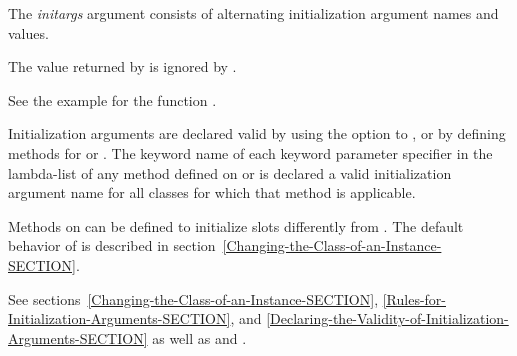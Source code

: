 \begin{defun}
The \emph{initargs} argument consists of alternating initialization
argument names and values.

The value returned by  is
ignored by .

See the example for the function .

Initialization arguments are declared valid by using the 
 option to , or by defining methods for 
 or .  The
keyword name of each keyword parameter specifier in the lambda-list of
any method defined on  or 
 is declared a valid initialization argument name
for all classes for which that method is applicable.

Methods on  can be defined to
initialize slots differently from .  The default
behavior of  is described in
section~\ref{Changing-the-Class-of-an-Instance-SECTION}.

See sections~\ref{Changing-the-Class-of-an-Instance-SECTION},
\ref{Rules-for-Initialization-Arguments-SECTION}, and
\ref{Declaring-the-Validity-of-Initialization-Arguments-SECTION} as well as
 and .
\end{defun}

